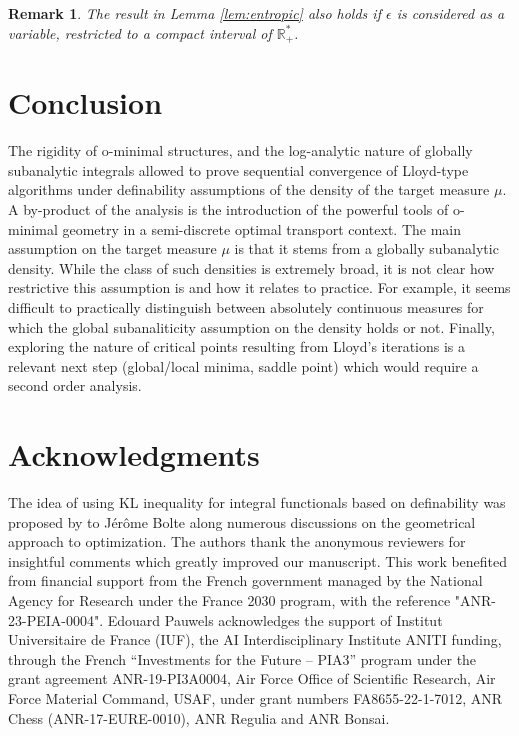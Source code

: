 \documentclass[11pt]{article}
\newcommand{\R}{\mathbb R}
\newcommand{\1}{\mathbbm{1}}
\newtheorem{rem}[lem]{Remark}
\numberwithin{equation}{section}
\begin{document}
\begin{rem}
	\label{rem:epsilon}
	The result in Lemma \ref{lem:entropic} also holds if $\epsilon$ is considered as a variable, restricted to a compact interval of $\R_+^*$.
\end{rem}

\section{Conclusion}

The rigidity of o-minimal structures, and the log-analytic nature of globally subanalytic integrals allowed to prove sequential convergence of Lloyd-type algorithms under definability assumptions of the density of the target measure $\mu$. A by-product of the analysis is the introduction of the powerful tools of o-minimal geometry in a semi-discrete optimal transport context. The main assumption on the target measure $\mu$ is that it stems from a globally subanalytic density. While the class of such densities is extremely broad, it is not clear how restrictive this assumption is and how it relates to practice. For example, it seems difficult to practically distinguish between absolutely continuous measures for which the global subanaliticity assumption on the density holds or not. Finally, exploring the nature of critical points resulting from Lloyd's iterations is a relevant next step (global/local minima, saddle point) which would require a second order analysis.


\section*{Acknowledgments}

The idea of using KL inequality for integral functionals based on definability was proposed by to Jérôme Bolte along numerous discussions on the geometrical approach to optimization.
The authors thank the anonymous reviewers for insightful comments which greatly improved our manuscript.
This work benefited from financial support from the French government managed by the National Agency for Research under the France 2030 program, with the reference "ANR-23-PEIA-0004".
Edouard Pauwels acknowledges the support of Institut Universitaire de France (IUF), the AI Interdisciplinary Institute ANITI funding, through the French ``Investments for the Future -- PIA3'' program under the grant agreement ANR-19-PI3A0004, Air Force Office of Scientific Research, Air Force Material Command, USAF, under grant numbers FA8655-22-1-7012, ANR Chess (ANR-17-EURE-0010), ANR Regulia and ANR Bonsai. 
\end{document}

